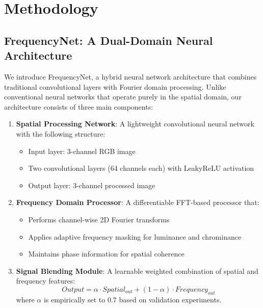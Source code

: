 \documentclass{article}
\begin{document}
\section{Methodology}

\subsection{FrequencyNet: A Dual-Domain Neural Architecture}
We introduce FrequencyNet, a hybrid neural network architecture that combines traditional convolutional layers with Fourier domain processing. Unlike conventional neural networks that operate purely in the spatial domain, our architecture consists of three main components:

\begin{enumerate}
    \item \textbf{Spatial Processing Network}: A lightweight convolutional neural network with the following structure:
    \begin{itemize}
        \item Input layer: 3-channel RGB image
        \item Two convolutional layers (64 channels each) with LeakyReLU activation
        \item Output layer: 3-channel processed image
    \end{itemize}
    
    \item \textbf{Frequency Domain Processor}: A differentiable FFT-based processor that:
    \begin{itemize}
        \item Performs channel-wise 2D Fourier transforms
        \item Applies adaptive frequency masking for luminance and chrominance
        \item Maintains phase information for spatial coherence
    \end{itemize}
    
    \item \textbf{Signal Blending Module}: A learnable weighted combination of spatial and frequency features:
    \begin{equation}
        Output = \alpha \cdot Spatial_{out} + (1-\alpha) \cdot Frequency_{out}
    \end{equation}
    where $\alpha$ is empirically set to 0.7 based on validation experiments.
\end{enumerate}
\end{document}

